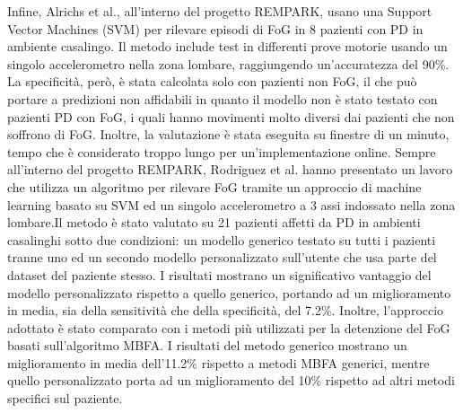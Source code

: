 Infine, Alrichs et al., all'interno del progetto REMPARK\cite{55}, usano una Support Vector Machines (SVM) per rilevare episodi di FoG in 8 pazienti con PD in ambiente casalingo. Il metodo include test in differenti prove motorie usando un singolo accelerometro nella zona lombare, raggiungendo un'accuratezza del 90\%. La specificità, però, è stata calcolata solo con pazienti non FoG, il che può portare a predizioni non affidabili in quanto il modello non è stato testato con pazienti PD con FoG, i quali hanno movimenti molto diversi dai pazienti che non soffrono di FoG. Inoltre, la valutazione è stata eseguita su finestre di un minuto, tempo che è considerato troppo lungo per un'implementazione online\cite{28}. Sempre all'interno del progetto REMPARK, Rodriguez et al. hanno presentato un lavoro che utilizza un algoritmo per rilevare FoG tramite un approccio di machine learning basato su SVM ed un singolo accelerometro a 3 assi indossato nella zona lombare\cite{HD}.Il metodo è stato valutato su 21 pazienti affetti da PD in ambienti casalinghi sotto due condizioni: un modello generico testato su tutti i pazienti tranne uno ed un secondo modello personalizzato sull'utente che usa parte del dataset del paziente stesso. I risultati mostrano un significativo vantaggio del modello personalizzato rispetto a quello generico, portando ad un miglioramento in media, sia della sensitività che della specificità, del 7.2\%. Inoltre, l'approccio adottato è stato comparato con i metodi più utilizzati per la detenzione del FoG basati sull'algoritmo MBFA. I risultati del metodo generico mostrano un miglioramento in media dell'11.2\% rispetto a metodi MBFA generici, mentre quello personalizzato porta ad un miglioramento del 10\% rispetto ad altri metodi specifici sul paziente.